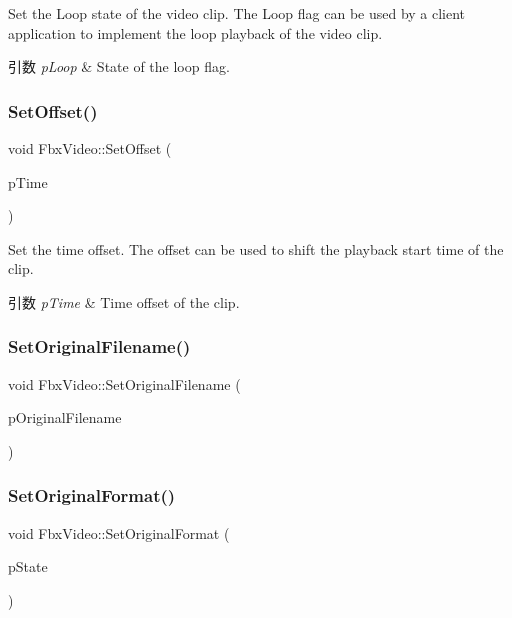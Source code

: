 Set the Loop state of the video clip. The Loop flag can be used by a client application to implement the loop playback of the video clip. 
\begin{DoxyParams}{引数}
{\em p\+Loop} & State of the loop flag. \\
\hline
\end{DoxyParams}
\mbox{\label{class_fbx_video_a8385942ed01c3258b7ebd7b3080962c2}} 
\subsubsection{\texorpdfstring{Set\+Offset()}{SetOffset()}}
{\footnotesize\ttfamily void Fbx\+Video\+::\+Set\+Offset (\begin{DoxyParamCaption}\item[{\hyperlink{class_fbx_time}{Fbx\+Time}}]{p\+Time }\end{DoxyParamCaption})}

Set the time offset. The offset can be used to shift the playback start time of the clip. 
\begin{DoxyParams}{引数}
{\em p\+Time} & Time offset of the clip. \\
\hline
\end{DoxyParams}
\mbox{\label{class_fbx_video_a67861ed77b1e7bfd2c1bce310f7406e6}} 
\subsubsection{\texorpdfstring{Set\+Original\+Filename()}{SetOriginalFilename()}}
{\footnotesize\ttfamily void Fbx\+Video\+::\+Set\+Original\+Filename (\begin{DoxyParamCaption}\item[{const char $\ast$}]{p\+Original\+Filename }\end{DoxyParamCaption})}

\mbox{\label{class_fbx_video_afc417f0c646bf474cbe976eb76d01099}} 
\subsubsection{\texorpdfstring{Set\+Original\+Format()}{SetOriginalFormat()}}
{\footnotesize\ttfamily void Fbx\+Video\+::\+Set\+Original\+Format (\begin{DoxyParamCaption}\item[{bool}]{p\+State }\end{DoxyParamCaption})}

